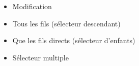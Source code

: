 \begin{itemize}
\tightlist
\item
  Modification
\end{itemize}

\begin{otherlanguage}{english}

\begin{Shaded}
\begin{Highlighting}[]
\AttributeTok{$}\NormalTok{(}\NormalTok{(}\NormalTok{)}\OperatorTok{;} 
\end{Highlighting}
\end{Shaded}

\end{otherlanguage}

\begin{itemize}
\tightlist
\item
  Tous les fils (sélecteur descendant)
\end{itemize}

\begin{otherlanguage}{english}

\begin{Shaded}
\begin{Highlighting}[]
\AttributeTok{$}\NormalTok{(}\NormalTok{)}\OperatorTok{;}
\end{Highlighting}
\end{Shaded}

\end{otherlanguage}

\begin{itemize}
\tightlist
\item
  Que les fils directs (sélecteur d'enfants)
\end{itemize}

\begin{otherlanguage}{english}

\begin{Shaded}
\begin{Highlighting}[]
\AttributeTok{$}\NormalTok{(}\NormalTok{)}\OperatorTok{;}
\end{Highlighting}
\end{Shaded}

\end{otherlanguage}

\begin{itemize}
\tightlist
\item
  Sélecteur multiple
\end{itemize}

